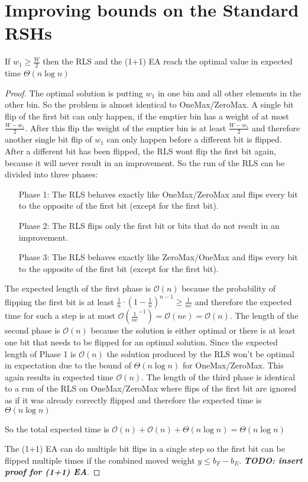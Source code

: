 \section{Improving bounds on the Standard RSHs}
\begin{lemma}\label{OneMaxResult}
    If $w_1 \ge \frac W 2$  then the RLS and the (1+1) EA reach the optimal value in expected time $\Theta(n\log{}n)$
\end{lemma}
\begin{proof}
    The optimal solution is putting $w_1$ in one bin and all other elements in the other bin. So the problem is almost identical to OneMax/ZeroMax. A single bit flip of the first bit can only happen, if the emptier bin has a weight of at most $\frac {W-w_1}{2}$. After this flip the weight of the emptier bin is at least $\frac {W-w_1}{2}$ and therefore another single bit flip of $w_1$ can only happen before a different bit is flipped. After a different bit has been flipped, the RLS wont flip the first bit again, because it will never result in an improvement. So the run of the RLS can be divided into three phases:
    \begin{itemize}
        \item[Phase 1:] The RLS behaves exactly like OneMax/ZeroMax and flips every bit to the opposite of the first bit (except for the first bit).
        \item[Phase 2:] The RLS flips only the first bit or bits that do not result in an improvement.
        \item[Phase 3:] The RLS behaves exactly like ZeroMax/OneMax and flips every bit to the opposite of the first bit (except for the first bit).
    \end{itemize}

    The expected length of the first phase is $\mathcal{O}(n)$ because the probability of flipping the first bit is at least ${\frac{1}{n}} \cdot {(1 - \frac{1}{n})}^{n-1} \ge \frac{1}{ne}$ and therefore the expected time for such a step is at most $\mathcal{O}(\frac{1}{ne}^{-1}) = \mathcal{O}(ne) = \mathcal{O}(n)$.\newline
    The length of the second phase is $\mathcal{O}(n)$ because the solution is either optimal or there is at least one bit that needs to be flipped for an optimal solution. Since the expected length of Phase 1 is $\mathcal{O}(n)$ the solution produced by the RLS won't be optimal in expectation due to the bound of $\Theta(n\log{}n)$ for OneMax/ZeroMax. This again results in expected time $\mathcal{O}(n)$.\newline
    The length of the third phase is identical to a run of the RLS on OneMax/ZeroMax where flips of the first bit are ignored as if it was already correctly flipped and therefore the expected time is $\Theta(n\log{}n)$

    So the total expected time is $\mathcal{O}(n) + \mathcal{O}(n) + \Theta(n\log{}n) = \Theta(n\log{}n)$

    The (1+1) EA can do multiple bit flips in a single step so the first bit can be flipped multiple times if the combined moved weight \(y \le b_F-b_E\). \textbf{\textit{TODO: insert proof for (1+1) EA}}.
\end{proof}

